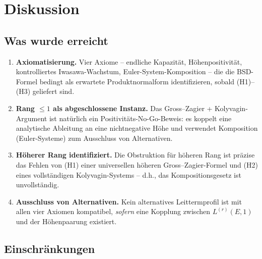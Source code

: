 \documentclass[aps,prd,twocolumn,superscriptaddress,nofootinbib,floatfix]{revtex4-2}
\theoremstyle{definition}
\theoremstyle{remark}
\begin{document}
\clearpage
\section{Diskussion}
\label{sec:discussion}

\subsection{Was wurde erreicht}

\begin{enumerate}
\item \textbf{Axiomatisierung.} Vier Axiome -- endliche Kapazität, Höhenpositivität, kontrolliertes Iwasawa-Wachstum, Euler-System-Komposition -- die die BSD-Formel bedingt als erwartete Produktnormalform identifizieren, sobald (H1)--(H3) geliefert sind.

\item \textbf{Rang $\leq 1$ als abgeschlossene Instanz.} Das Gross--Zagier + Kolyvagin-Argument ist natürlich ein Positivitäts-No-Go-Beweis: es koppelt eine analytische Ableitung an eine nichtnegative Höhe und verwendet Komposition (Euler-Systeme) zum Ausschluss von Alternativen.

\item \textbf{Höherer Rang identifiziert.} Die Obstruktion für höheren Rang ist präzise das Fehlen von (H1) einer universellen höheren Gross--Zagier-Formel und (H2) eines vollständigen Kolyvagin-Systems -- d.h., das Kompositionsgesetz ist unvollständig.

\item \textbf{Ausschluss von Alternativen.} Kein alternatives Leittermprofil ist mit allen vier Axiomen kompatibel, \textit{sofern} eine Kopplung zwischen $L^{(r)}(E,1)$ und der Höhenpaarung existiert.
\end{enumerate}

\subsection{Einschränkungen}
\end{document}
